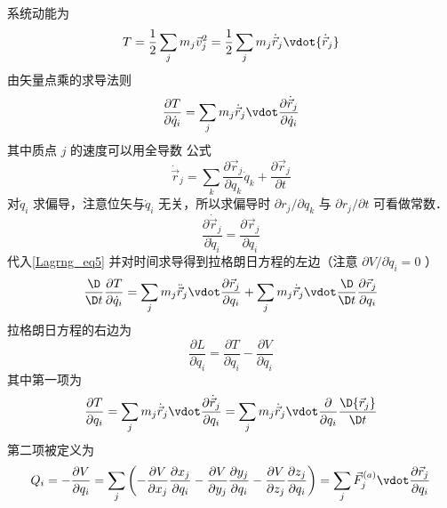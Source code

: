 系统动能为
\begin{equation}
T = \frac{1}{2}\sum\limits_j {{m_j}{{\vec v_j}^2}}  = \frac{1}{2}\sum\limits_j {m_j}{{\dot{\vec r}}_j} \vdot {{\dot {\vec r}}_j}
\end{equation}
由矢量点乘的求导法则
\begin{equation}\label{Lagrng_eq5}
\frac{{\partial T}}{{\partial {{\dot q}_i}}} = \sum\limits_j {{m_j}{{\dot {\vec r}}_j} \vdot \frac{{\partial {{\dot {\vec r}}_j}}}{{\partial {{\dot q}_i}}}}
\end{equation}
其中质点 $j$ 的速度可以用全导数 公式
\begin{equation}
{{\dot {\vec r}}_j} = \sum\limits_k {\frac{{\partial {{\vec r}_j}}}{{\partial {q_k}}}{{\dot q}_k}}  + \frac{{\partial {{\vec r}_j}}}{{\partial t}}
\end{equation}
对$\dot q_i$ 求偏导，注意位矢与$\dot q_i$ 无关，所以求偏导时 $\partial {r_j}/\partial {q_k}$ 与 $\partial {r_j}/\partial t$ 可看做常数．
\begin{equation}\label{Lagrng_eq27}
\frac{{\partial {{\dot {\vec r}}_j}}}{{\partial {{\dot q}_i}}} = \frac{{\partial {{\vec r}_j}}}{{\partial {q_i}}}
\end{equation}
代入\autoref{Lagrng_eq5} 并对时间求导得到拉格朗日方程的左边（注意 $\partial V/\partial\dot q_i = 0$ ）
\begin{equation}\label{Lagrng_eq8}
\frac{\D}{{\D t}}\frac{{\partial T}}{{\partial {{\dot q}_i}}} = \sum\limits_j {{m_j}{{\ddot {\vec r}}_j} \vdot \frac{{\partial {{\vec r}_j}}}{{\partial {q_i}}}}  + \sum\limits_j {{m_j}{{\dot {\vec r}}_j} \vdot \frac{\D}{{\D t}}\frac{{\partial {{\vec r}_j}}}{{\partial {q_i}}}} 
\end{equation}
拉格朗日方程的右边为
\begin{equation}\label{Lagrng_eq9}
\frac{{\partial L}}{{\partial {q_i}}} = \frac{{\partial T}}{{\partial {q_i}}} - \frac{{\partial V}}{{\partial {q_i}}}
\end{equation}
其中第一项为
\begin{equation}\label{Lagrng_eq28}
\frac{{\partial T}}{{\partial {q_i}}} = \sum\limits_j {{m_j}{{\dot {\vec r}}_j} \vdot \frac{{\partial {{\dot {\vec r}}_j}}}{{\partial {q_i}}}} = \sum\limits_j {{m_j}{{\dot {\vec r}}_j} \vdot \frac{\partial }{{\partial {q_i}}}\frac{{\D{{\vec r}_j}}}{{\D t}}}
\end{equation}
第二项被定义为
\begin{equation}\label{Lagrng_eq29}
Q_i = - \frac{{\partial V}}{{\partial {q_i}}} = \sum\limits_j {\left( { - \frac{{\partial V}}{{\partial {x_j}}}\frac{{\partial {x_j}}}{{\partial {q_i}}} - \frac{{\partial V}}{{\partial {y_j}}}\frac{{\partial {y_j}}}{{\partial {q_i}}} - \frac{{\partial V}}{{\partial {z_j}}}\frac{{\partial {z_j}}}{{\partial {q_i}}}} \right)}  = \sum\limits_j {{{\vec F}_j^{(a)}} \vdot \frac{{\partial {{\vec r}_j}}}{{\partial {q_i}}}}  
\end{equation}
